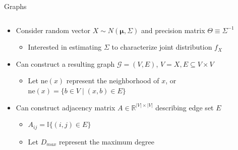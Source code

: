 \documentclass{beamer}
\newcommand{\nhood}{\text{ne}}
\begin{document}
\begin{frame}{Graphs}
    \begin{columns}[T] %
        \begin{column}{.7\textwidth}
            \begin{itemize}%
                \setlength\itemsep{5mm}
                \item Consider random vector $X \sim N(\boldsymbol\mu, \Sigma)$ and precision matrix $\Theta \equiv \Sigma^{-1}$
                \begin{itemize} 
                    \item Interested in estimating $\Sigma$ to characterize joint distribution $f_X$
                \end{itemize}
                \item Can construct a resulting graph $\mathcal{G} = (V, E)$, $V = X, E \subseteq V \times V$
                \begin{itemize} \item Let $\nhood(x)$ represent the neighborhood of $x$, or $\nhood(x) = \{b \in V \mid (x,b) \in E\}$ \end{itemize}
                \item Can construct adjacency matrix $A \in \mathbb{R}^{|V| \times |V|}$ describing edge set $E$ 
                    \begin{itemize} 
                        \item $A_{ij}=\mathbb{I}\{(i,j) \in E\}$ 
                        \item Let $D_{max}$ represent the maximum degree 
                    \end{itemize}
                \end{itemize}
        \end{column}
        \begin{column}{.3\textwidth}
                \centering
\end{column}
\end{columns}
\end{frame}
\end{document}
